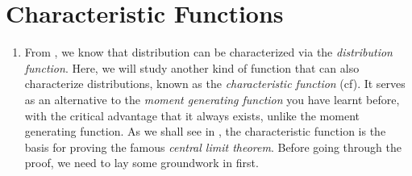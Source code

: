 \section{Characteristic Functions}
\label{sect:char-fun}
\begin{enumerate}
\item From , we know that distribution can be
characterized via the \emph{distribution function}. Here, we will study another
kind of function that can also characterize distributions, known as the
\emph{characteristic function} (cf). It serves as an alternative to the
\emph{moment generating function} you have learnt before, with the critical
advantage that it always exists, unlike the moment generating function. As we
shall see in , the characteristic function is the basis for
proving the famous \emph{central limit theorem}.  Before going through the
proof, we need to lay some groundwork in  first.
\end{enumerate}
